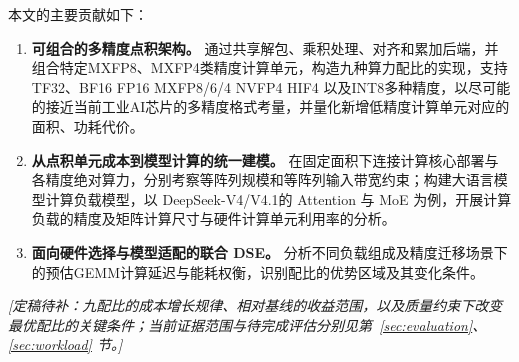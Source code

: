 本文的主要贡献如下：
\begin{enumerate}
\item \textbf{可组合的多精度点积架构。} 通过共享解包、乘积处理、对齐和累加后端，并组合特定MXFP8、MXFP4类精度计算单元，构造九种算力配比的实现，支持TF32、BF16 FP16 MXFP8/6/4 NVFP4 HIF4 以及INT8多种精度，以尽可能的接近当前工业AI芯片的多精度格式考量，并量化新增低精度计算单元对应的面积、功耗代价。
\item \textbf{从点积单元成本到模型计算的统一建模。} 在固定面积下连接计算核心部署与各精度绝对算力，分别考察等阵列规模和等阵列输入带宽约束；构建大语言模型计算负载模型，以 DeepSeek-V4/V4.1的 Attention 与 MoE 为例，开展计算负载的精度及矩阵计算尺寸与硬件计算单元利用率的分析。
\item \textbf{面向硬件选择与模型适配的联合 DSE。} 分析不同负载组成及精度迁移场景下的预估GEMM计算延迟与能耗权衡，识别配比的优势区域及其变化条件。%
\end{enumerate}
\noindent\textit{[定稿待补：九配比的成本增长规律、相对基线的收益范围，以及质量约束下改变最优配比的关键条件；当前证据范围与待完成评估分别见第~\ref{sec:evaluation}、\ref{sec:workload} 节。]}
